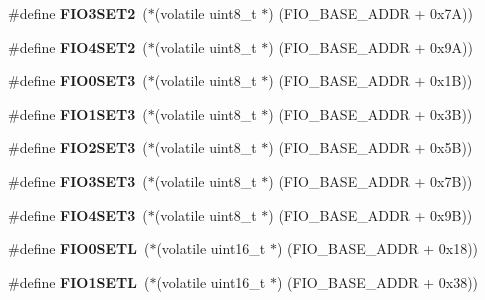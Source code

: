 \begin{DoxyCompactItemize}
\#define {\bfseries F\+I\+O3\+S\+E\+T2}~($\ast$(volatile uint8\+\_\+t $\ast$) (F\+I\+O\+\_\+\+B\+A\+S\+E\+\_\+\+A\+D\+DR + 0x7\+A))
\item 
\mbox{\label{group__lpc24xx__regs_ga6acfbf77608921bc4741f1090e50d7d3}} 
\#define {\bfseries F\+I\+O4\+S\+E\+T2}~($\ast$(volatile uint8\+\_\+t $\ast$) (F\+I\+O\+\_\+\+B\+A\+S\+E\+\_\+\+A\+D\+DR + 0x9\+A))
\item 
\mbox{\label{group__lpc24xx__regs_ga221919559cdc8c3496dfc395d9d59eb0}} 
\#define {\bfseries F\+I\+O0\+S\+E\+T3}~($\ast$(volatile uint8\+\_\+t $\ast$) (F\+I\+O\+\_\+\+B\+A\+S\+E\+\_\+\+A\+D\+DR + 0x1\+B))
\item 
\mbox{\label{group__lpc24xx__regs_gae1630e2e767466cec068e8e7f3e5049e}} 
\#define {\bfseries F\+I\+O1\+S\+E\+T3}~($\ast$(volatile uint8\+\_\+t $\ast$) (F\+I\+O\+\_\+\+B\+A\+S\+E\+\_\+\+A\+D\+DR + 0x3\+B))
\item 
\mbox{\label{group__lpc24xx__regs_ga14e0ffc79949128f0d199d058a426835}} 
\#define {\bfseries F\+I\+O2\+S\+E\+T3}~($\ast$(volatile uint8\+\_\+t $\ast$) (F\+I\+O\+\_\+\+B\+A\+S\+E\+\_\+\+A\+D\+DR + 0x5\+B))
\item 
\mbox{\label{group__lpc24xx__regs_ga2dfc3b8d33a84bb50b012a4533b97351}} 
\#define {\bfseries F\+I\+O3\+S\+E\+T3}~($\ast$(volatile uint8\+\_\+t $\ast$) (F\+I\+O\+\_\+\+B\+A\+S\+E\+\_\+\+A\+D\+DR + 0x7\+B))
\item 
\mbox{\label{group__lpc24xx__regs_gab1fe21c07c16ed88b3ede7efe76e861b}} 
\#define {\bfseries F\+I\+O4\+S\+E\+T3}~($\ast$(volatile uint8\+\_\+t $\ast$) (F\+I\+O\+\_\+\+B\+A\+S\+E\+\_\+\+A\+D\+DR + 0x9\+B))
\item 
\mbox{\label{group__lpc24xx__regs_ga0c81f5d08ab384fa3f2e65773352788a}} 
\#define {\bfseries F\+I\+O0\+S\+E\+TL}~($\ast$(volatile uint16\+\_\+t $\ast$) (F\+I\+O\+\_\+\+B\+A\+S\+E\+\_\+\+A\+D\+DR + 0x18))
\item 
\mbox{\label{group__lpc24xx__regs_gad9952e2dc15a66ece9e7225406dde19c}} 
\#define {\bfseries F\+I\+O1\+S\+E\+TL}~($\ast$(volatile uint16\+\_\+t $\ast$) (F\+I\+O\+\_\+\+B\+A\+S\+E\+\_\+\+A\+D\+DR + 0x38))

\end{DoxyCompactItemize}
